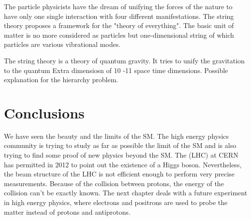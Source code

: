       The particle physicists have the dream of unifying the forces of the nature to have only one single interaction with four different manifestations.
      The string theory proposes a framework for the "theory of everything".
      The basic unit of matter is no more considered as particles but one-dimensional string of which particles are various vibrational modes.

      The string theory is a theory of quantum gravity.
      It tries to unify the gravitation to the quantum 
      Extra dimensiosn of 10 -11 space time dimensions.
      Possible explanation for the hierarchy problem.

    \section{Conclusions}

    We have seen the beauty and the limits of the \acrshort{SM}.
    The high energy physics community is trying to study as far as possible the limit of the \acrshort{SM} and is also trying to find some proof of new physics beyond the \acrshort{SM}.
    The (LHC) at CERN has permitted in 2012 to point out the existence of a Higgs boson.  
    Nevertheless, the beam structure of the LHC is not efficient enough to perform very precise measurements.
    Because of the collision between protons, the energy of the collision can't be exactly known.
    The next chapter deals with a future experiment in high energy physics, where electrons and positrons are used to probe the matter instead of protons and antiprotons.
